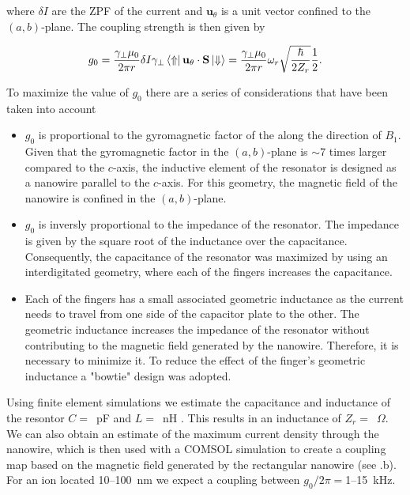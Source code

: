 \noindent where $\delta I$ are the ZPF of the current and $\mathbf{u}_\theta$ is a unit vector confined to the $(a, b)$-plane. The coupling strength is then given by

\begin{align}
\begin{split}
    g_0 = \frac{\gamma_\perp \mu_0}{2 \pi r} \delta I \gamma_\perp \bra{\Uparrow}  \mathbf{u}_\theta \cdot \mathbf{S} \ket{\Downarrow} = \frac{\gamma_\perp \mu_0}{2 \pi r} \omega_r \sqrt{\frac{\hbar}{2Z_r}} \frac{1}{2}.
\end{split}
\end{align}

To maximize the value of $g_0$ there are a series of considerations that have been taken into account

\begin{itemize}
    \item $g_0$ is proportional to the gyromagnetic factor of the \Er along the direction of $B_1$. Given that the gyromagnetic factor in the $(a, b)$-plane is $\sim$7 times larger compared to the $c$-axis, the inductive element of the resonator is designed as a nanowire parallel to the $c$-axis. For this geometry, the magnetic field of the nanowire is confined in the $(a, b)$-plane. 
    \item $g_0$ is inversly proportional to the impedance of the resonator. The impedance is given by the square root of the inductance over the capacitance. Consequently, the capacitance of the resonator was maximized by using an interdigitated geometry, where each of the fingers increases the capacitance.
    \item Each of the fingers has a small associated geometric inductance as the current needs to travel from one side of the capacitor plate to the other. The geometric inductance increases the impedance of the resonator without contributing to the magnetic field generated by the nanowire. Therefore, it is necessary to minimize it. To reduce the effect of the finger's geometric inductance a "bowtie" design was adopted.
\end{itemize} 

Using finite element simulations we estimate the capacitance and inductance of the resontor $C=$~pF and $L=$~nH . This results in an inductance of $Z_r=$~$\Omega$. We can also obtain an estimate of the maximum current density through the nanowire, which is then used with a COMSOL simulation to create a coupling map based on the magnetic field generated by the rectangular nanowire (see .b). For an \Er ion located 10--100~nm we expect a coupling between $g_0/2\pi=$1--15~kHz.

